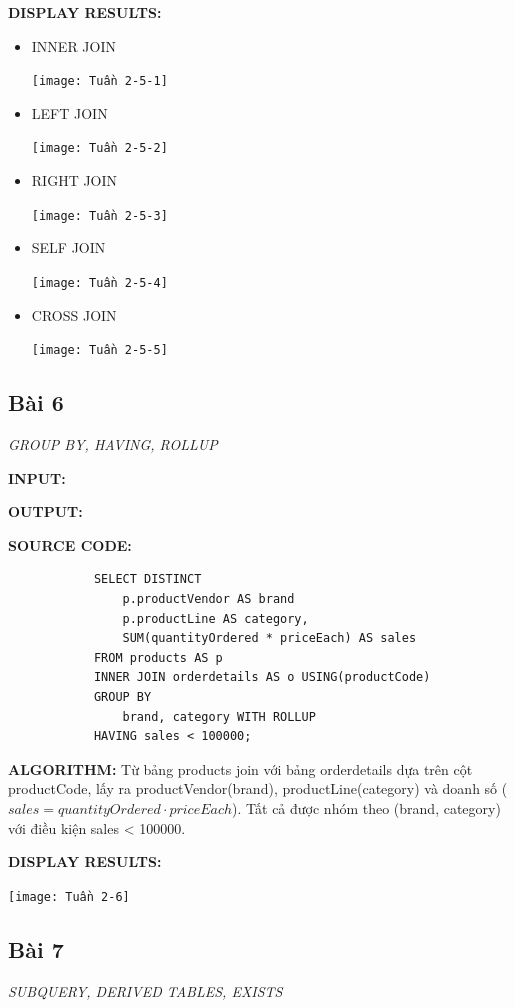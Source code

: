 \documentclass[12pt,a4paper]{report}
\begin{document}
	{\bf DISPLAY RESULTS:}
		\begin{itemize}
			\item INNER JOIN
				\begin{center}
					\texttt{[image: Tuần 2-5-1]}
				\end{center}
			\item LEFT JOIN
				\begin{center}
					\texttt{[image: Tuần 2-5-2]}
				\end{center}
			\item RIGHT JOIN
				\begin{center}
					\texttt{[image: Tuần 2-5-3]}
				\end{center}
			\item SELF JOIN
				\begin{center}
					\texttt{[image: Tuần 2-5-4]}
				\end{center}
			\item CROSS JOIN
				\begin{center}
					\texttt{[image: Tuần 2-5-5]}
				\end{center}
		\end{itemize}
\subsection{Bài 6}
	\begin{center}
		{\it GROUP BY, HAVING, ROLLUP}
	\end{center}
	
	{\bf INPUT:}
	
	{\bf OUTPUT:}
	
	{\bf SOURCE CODE:}
		\begin{lstlisting}
			SELECT DISTINCT
				p.productVendor AS brand
				p.productLine AS category,
				SUM(quantityOrdered * priceEach) AS sales
			FROM products AS p
			INNER JOIN orderdetails AS o USING(productCode)
			GROUP BY
				brand, category WITH ROLLUP
			HAVING sales < 100000;
		\end{lstlisting}
		
	{\bf ALGORITHM:} Từ bảng products join với bảng orderdetails dựa trên cột productCode, lấy ra productVendor(brand), productLine(category) và doanh số ($sales=quantityOrdered\cdot priceEach$). Tất cả được nhóm theo (brand, category) với điều kiện sales < 100000.
	
	{\bf DISPLAY RESULTS:}
		\begin{center}
			\texttt{[image: Tuần 2-6]}
		\end{center}
\subsection{Bài 7}
	\begin{center}
		{\it SUBQUERY, DERIVED TABLES, EXISTS}
	\end{center}
	
\end{document}
